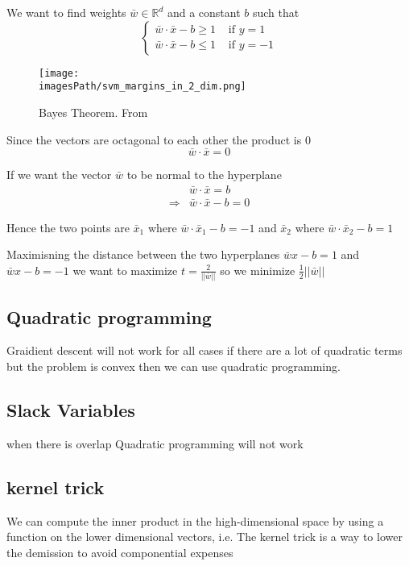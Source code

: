 \begin{multicols}{2}
We want to find weights $\bar{w} \in \mathbb{R}^d$ and a constant $b$ such that
\begin{equation*}
    \begin{cases}
        \bar{w} \cdot \bar{x} -b \geq 1 & \text{ if } y=1 \\
        \bar{w} \cdot \bar{x} -b \leq 1 & \text{ if } y=-1
    \end{cases}
\end{equation*}


\begin{figure}[H]
    \centering
    \texttt{[image: \\imagesPath/svm\_margins\_in\_2\_dim.png]}
    \caption{Bayes Theorem. From \cite{iml}}
\end{figure}


Since the vectors are octagonal to each other the product is 0
\begin{equation*}
    \bar{w}\cdot\bar{x} = 0
\end{equation*}

If we want the vector $\bar{w}$ to be normal to the hyperplane
\begin{align*}
    &\bar{w}\cdot\bar{x} = b \\
    \Rightarrow &\bar{w}\cdot\bar{x} - b = 0
\end{align*}

Hence the two points are $\bar{x}_1$ where $\bar{w}\cdot\bar{x}_1 -b = -1$ and 
$\bar{x}_2$ where $\bar{w}\cdot\bar{x}_2 -b = 1$

Maximisning the distance between the two hyperplanes $\bar{w}x-b=1$ and $\bar{w}x-b=-1$
we want to maximize $t=\frac{2}{||\bar{w}||}$ so we minimize $\frac{1}{2}||\bar{w}||$

\subsection{Quadratic programming}
Graidient descent will not work for all cases if there are a lot of quadratic terms but 
the problem is convex then we can use quadratic programming.

\subsection{Slack Variables}
when there is overlap Quadratic programming will not work

\subsection{kernel trick}
We can compute the inner product in the high-dimensional space by
using a function on the lower dimensional vectors,
i.e. The kernel trick is a way to lower the demission to avoid componential expenses


\end{multicols}
